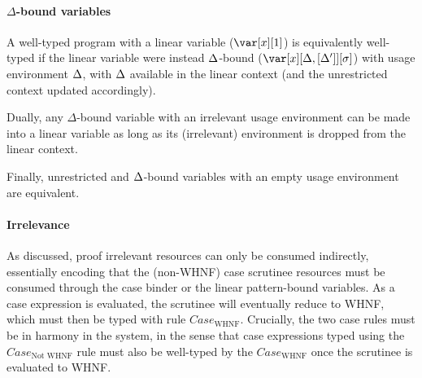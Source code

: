 \documentclass[acmsmall,review,anonymous]{acmart}
\begin{document}
\paragraph{$\Delta$-bound variables} %
A well-typed program with a linear variable ($\xl$) is equivalently
well-typed if the linear variable were instead $\Delta$-bound ($\xD$) with
usage environment $\Delta$, with $\Delta$ available in the linear context (and the unrestricted context updated accordingly).

\LinearDeltaRelationLemma


\noindent Dually, any $\Delta$-bound variable with an irrelevant usage
environment can be made into a linear variable as long as its
(irrelevant) environment is dropped from the linear context.


\DeltaLinearRelationLemma


\noindent Finally, unrestricted and $\Delta$-bound
variables with an empty usage environment are equivalent.

\DeltaUnrestrictedRelationLemma

\paragraph{Irrelevance}
%
As discussed, proof irrelevant resources can only be consumed
indirectly, essentially encoding that the (non-WHNF) case scrutinee
resources must be consumed through the case binder or the linear
pattern-bound variables.
%
As a case expression is evaluated, the scrutinee will eventually
reduce to WHNF,
which must then be typed with rule $Case_{\textrm{WHNF}}$.
%
Crucially, the two case rules must be in harmony in the system, in the sense that
case expressions typed using the $Case_{\textrm{Not WHNF}}$ rule must also be
well-typed by the $Case_{\textrm{WHNF}}$ once the scrutinee is evaluated to WHNF.
\end{document}
